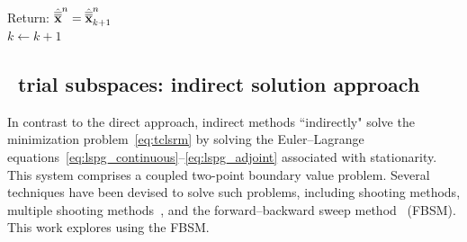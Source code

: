 \begin{algorithm}
{{Return: $\hat{\overline{\overline{\mathbf {x}}}}^{n} = \hat{\overline{\overline{\mathbf {x}}}}^{n}_{k+1} $ \\
}
$k\leftarrow k+1$
}
\end{algorithm}


%

\subsection{\spatialAcronym\ trial subspaces: indirect solution approach}\label{sec:indirect}
In contrast to the direct approach,
indirect methods ``indirectly" solve the minimization
problem~\eqref{eq:tclsrm} by solving the Euler--Lagrange
equations~\eqref{eq:lspg_continuous}--\eqref{eq:lspg_adjoint} associated with
stationarity. This
system comprises a coupled two-point boundary value
problem. Several techniques have
been devised to solve such problems, 
including shooting methods, multiple shooting
methods~\cite{multiple_shooting}, and the forward--backward sweep
method~\cite{fbs} (FBSM).  This work explores using the FBSM. 


